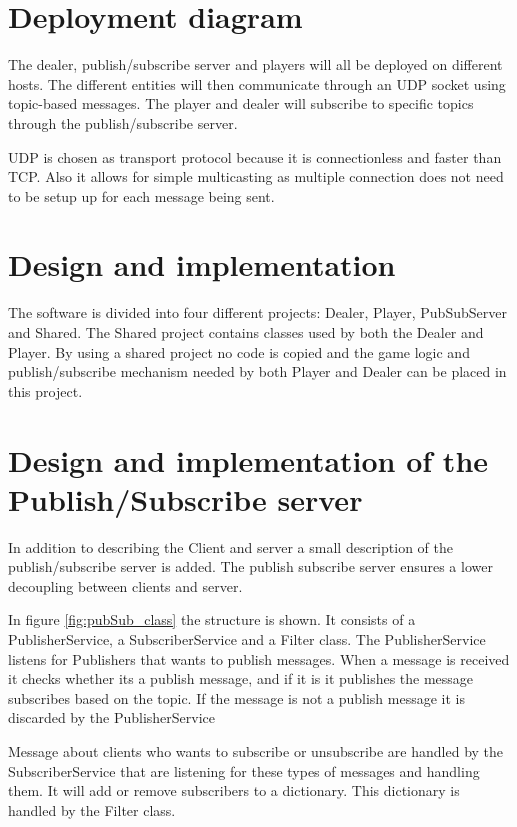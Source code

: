 \section{Deployment diagram}
The dealer, publish/subscribe server and players will all be deployed on different hosts. The different entities will then communicate through an UDP socket using topic-based messages. The player and dealer will subscribe to specific topics through the publish/subscribe server.


UDP is chosen as transport protocol because it is connectionless and faster than TCP. Also it allows for simple multicasting as multiple connection does not need to be setup up for each message being sent.

\section{Design and implementation}
The software is divided into four different projects: Dealer, Player, PubSubServer and Shared. The Shared project contains classes used by both the Dealer and Player. By using a shared project no code is copied and the game logic and publish/subscribe mechanism needed by both Player and Dealer can be placed in this project.

\section{Design and implementation of the Publish/Subscribe server}
In addition to describing the Client and server a small description of the publish/subscribe server is added. The publish subscribe server ensures a lower decoupling between clients and server.


In figure \ref{fig:pubSub_class} the structure is shown. It consists of a PublisherService, a SubscriberService and a Filter class. The PublisherService listens for Publishers that wants to publish messages. When a message is received it checks whether its a publish message, and if it is it publishes the message subscribes based on the topic. If the message is not a publish message it is discarded by the PublisherService

Message about clients who wants to subscribe or unsubscribe are handled by the SubscriberService that are listening for these types of messages and handling them. It will add  or remove subscribers to a dictionary. This dictionary is handled by the Filter class.

